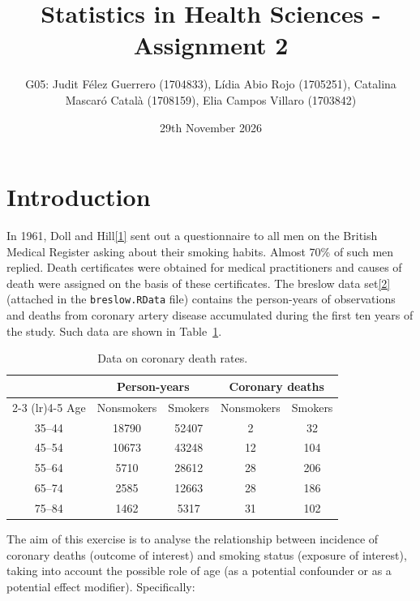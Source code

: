 \documentclass[a4paper,10pt]{article}\usepackage[]{graphicx}\usepackage[]{xcolor}
\begin{document}
\title{Statistics in Health Sciences - Assignment 2}
\author{G05: Judit Félez Guerrero (1704833), Lídia Abio Rojo (1705251), Catalina Mascaró Català (1708159), Elia Campos Villaro (1703842)}
\date{29th November 2026}
\maketitle
\thispagestyle{empty} %


\newpage
{} %

\section{Introduction}
\label{sec:introduction}

In 1961, Doll and Hill\hyperlink{ref:doll}{[1]} sent out a questionnaire to all men on the British Medical Register asking about their smoking habits. Almost 70\% of such men replied. Death certificates were obtained for medical practitioners and causes of death were assigned on the basis of these certificates. The breslow data set\hyperlink{ref:breslow}{[2]} (attached in the \texttt{breslow.RData} file) contains the person-years of observations and deaths from coronary artery disease accumulated during the first ten years of the study. Such data are shown in Table~\ref{tab:coronary}.


\begin{table}[ht]
\centering
\begin{tabular}{c cc cc}
\toprule
& \multicolumn{2}{c}{Person-years}
& \multicolumn{2}{c}{Coronary deaths} \\
\cmidrule(lr){2-3} \cmidrule(lr){4-5}
Age & Nonsmokers & Smokers & Nonsmokers & Smokers \\
\midrule
35--44 & 18790 & 52407 & 2  & 32  \\
45--54 & 10673 & 43248 & 12 & 104 \\
55--64 & 5710  & 28612 & 28 & 206 \\
65--74 & 2585  & 12663 & 28 & 186 \\
75--84 & 1462  & 5317  & 31 & 102 \\
\bottomrule
\end{tabular}
\caption{Data on coronary death rates.}
\label{tab:coronary}
\end{table}

The aim of this exercise is to analyse the relationship between incidence of coronary deaths (outcome of interest) and smoking status (exposure of interest), taking into account the possible role of age (as a potential confounder or as a potential effect modifier). Specifically:
\end{document}
